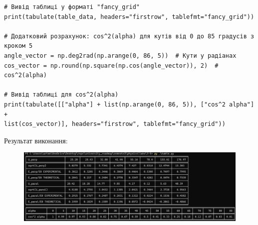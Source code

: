 \documentclass[12pt,a4paper]{article}
\begin{document}
{\begin{verbatim}
# Вивід таблиці у форматі "fancy_grid"
print(tabulate(table_data, headers="firstrow", tablefmt="fancy_grid"))

# Додатковий розрахунок: cos^2(alpha) для кутів від 0 до 85 градусів з кроком 5
angle_vector = np.deg2rad(np.arange(0, 86, 5))  # Кути у радіанах
cos_vector = np.round(np.square(np.cos(angle_vector)), 2)  # cos^2(alpha)

# Вивід таблиці для cos^2(alpha)
print(tabulate([["alpha"] + list(np.arange(0, 86, 5)), ["cos^2 alpha"] +
list(cos_vector)], headers="firstrow", tablefmt="fancy_grid"))
  \end{verbatim}
      }

      Результат виконання:

    \begin{figure}[ht]
        \centering
        \includegraphics[width=1.0\textwidth]{result.png}
    \end{figure}
\end{document}
